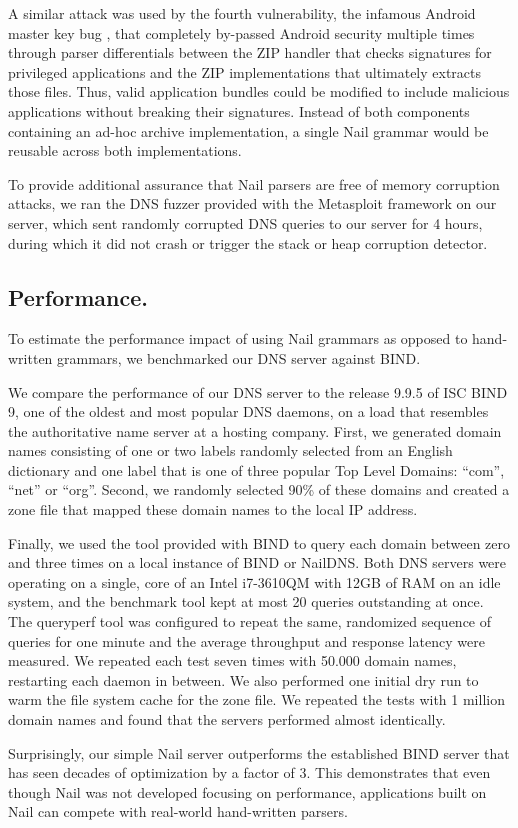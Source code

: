 A similar attack was used by the fourth vulnerability, the infamous Android master key bug
\cite{saurik-masterkey}, that completely by-passed Android security multiple times through parser
differentials between the ZIP handler that checks signatures for privileged applications and the ZIP
implementations that ultimately extracts those files. Thus, valid  application bundles could be
modified to include malicious applications without breaking their signatures. Instead of both
components containing an ad-hoc archive implementation, a single Nail grammar would be reusable
across both implementations. 

To provide additional assurance that Nail parsers are free of memory corruption attacks, we ran the
DNS fuzzer provided with the Metasploit\cite{mspframework} framework on our server, which sent
randomly corrupted DNS queries to our server for 4 hours, during which it did not crash or trigger
the stack or heap corruption detector.
\subsection{Performance.}

To estimate the performance impact of using Nail grammars as opposed to hand-written grammars, we
benchmarked our DNS server against BIND.

We compare the performance of our DNS server to the release 9.9.5 of ISC BIND 9\cite{bind9}, one of
the oldest and most popular DNS daemons, on a load that resembles the authoritative name server at a
hosting company. First, we generated domain names consisting of one or
two labels randomly selected from an English dictionary and one label that is one of three popular
Top Level Domains: ``com'', ``net'' or ``org''. Second, we randomly selected 90\% of these domains and
created a zone file that mapped these domain names to the local IP address. 

Finally, we used the  tool provided with BIND to query each domain between zero
and three times on a local instance of BIND or NailDNS. Both DNS servers were operating on a single, 
core  of an Intel i7-3610QM with 12GB of RAM on an idle system, and the benchmark tool kept at most 20
queries outstanding at once. The queryperf tool was configured to
repeat the same, randomized sequence of queries for one minute and the average throughput and
response latency were measured.  We repeated each test seven times  with 50.000
domain names, restarting each daemon in between. We also performed one initial dry run to warm the
file system cache for the zone file. We repeated the tests with 1 million domain names and found
that the servers performed almost identically.

Surprisingly, our simple Nail server outperforms the established BIND server that has seen decades
of optimization by a factor of 3.  This demonstrates that even though Nail was
not developed focusing on performance, applications built on Nail can compete with real-world
hand-written parsers.




